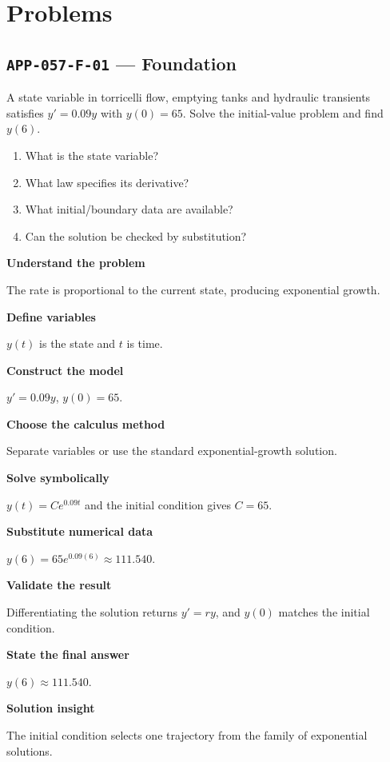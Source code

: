 \documentclass[11pt]{book}
\newcommand{\pid}[1]{\texttt{#1}}
\begin{document}
\section*{Problems}
\subsection*{\pid{APP-057-F-01} — Foundation}
\begin{problembox}
A state variable in torricelli flow, emptying tanks and hydraulic transients satisfies $y'=0.09y$ with $y(0)=65$. Solve the initial-value problem and find $y(6)$.
\end{problembox}
\begin{promptbox}\begin{enumerate}
\item What is the state variable?
\item What law specifies its derivative?
\item What initial/boundary data are available?
\item Can the solution be checked by substitution?
\end{enumerate}\end{promptbox}
\begin{solutionbox}
\textbf{Understand the problem}\par The rate is proportional to the current state, producing exponential growth.\par\medskip
\textbf{Define variables}\par $y(t)$ is the state and $t$ is time.\par\medskip
\textbf{Construct the model}\par $y'=0.09y$, $y(0)=65$.\par\medskip
\textbf{Choose the calculus method}\par Separate variables or use the standard exponential-growth solution.\par\medskip
\textbf{Solve symbolically}\par $y(t)=Ce^{0.09t}$ and the initial condition gives $C=65$.\par\medskip
\textbf{Substitute numerical data}\par $y(6)=65e^{0.09(6)}\approx 111.540$.\par\medskip
\textbf{Validate the result}\par Differentiating the solution returns $y'=ry$, and $y(0)$ matches the initial condition.\par\medskip
\textbf{State the final answer}\par $y(6)\approx 111.540$.\par\medskip
\textbf{Solution insight}\par The initial condition selects one trajectory from the family of exponential solutions.\par\medskip
\end{solutionbox}
\end{document}
